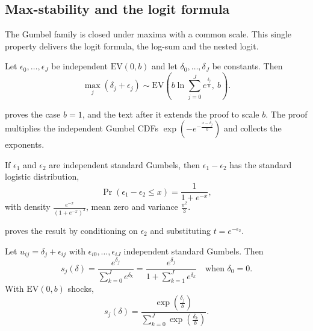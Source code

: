\subsection{Max-stability and the logit formula}\label{sec:B-maxstable}

The Gumbel family is closed under maxima with a common scale. This single property delivers the logit
formula, the log-sum and the nested logit.

\begin{proposition}\label{prop:B-maxstable}
Let $\epsilon_0, \dots, \epsilon_J$ be independent $\mathrm{EV}(0, b)$ and let $\delta_0, \dots, \delta_J$ be constants. Then
\begin{equation}\label{eq:B-maxstable}
\max_j(\delta_j + \epsilon_j) \sim \mathrm{EV}\left(b\ln\sum_{j = 0}^Je^{\frac{\delta_j}{b}},\ b\right).
\end{equation}
\end{proposition}

 proves the case $b = 1$, and the text after it extends the proof to scale $b$. The proof
multiplies the independent Gumbel CDFs $\exp(-e^{-\frac{x - \delta_j}{b}})$ and collects the exponents.

\begin{proposition}\label{prop:B-logistic}
If $\epsilon_1$ and $\epsilon_2$ are independent standard Gumbels, then $\epsilon_1 - \epsilon_2$ has the standard
logistic distribution,
\begin{equation*}
\Pr(\epsilon_1 - \epsilon_2 \leq x) = \frac{1}{1 + e^{-x}},
\end{equation*}
with density $\frac{e^{-x}}{(1 + e^{-x})^2}$, mean zero and variance $\frac{\pi^2}{3}$.
\end{proposition}

 proves the result by conditioning on $\epsilon_2$ and substituting $t = e^{-\epsilon_2}$.

\begin{theorem}\label{thm:B-logit}
Let $u_{ij} = \delta_j + \epsilon_{ij}$ with $\epsilon_{i0}, \dots, \epsilon_{iJ}$ independent standard Gumbels. Then
\begin{equation}\label{eq:B-logit}
s_j(\delta) = \frac{e^{\delta_j}}{\sum_{k = 0}^Je^{\delta_k}} = \frac{e^{\delta_j}}{1 + \sum_{k = 1}^Je^{\delta_k}}
\quad\text{when } \delta_0 = 0 .
\end{equation}
With $\mathrm{EV}(0, b)$ shocks,
\begin{equation*}
s_j(\delta) = \frac{\exp\left(\frac{\delta_j}{b}\right)}{\sum_{k = 0}^J\exp\left(\frac{\delta_k}{b}\right)} .
\end{equation*}
\end{theorem}

